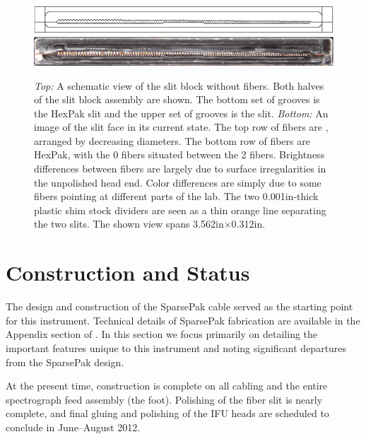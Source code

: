 \begin{figure}[t]
    \centering
    \includegraphics[width=\textwidth]{Pak_build/figs/slit}\\
    \vspace{2pt}
    \includegraphics[width=\textwidth]{Pak_build/figs/slit_img}
    \caption[HexPak/\GP slit]{\fixspacing \emph{Top:} A schematic view of the
      slit block without fibers.  Both halves of the slit block assembly are
      shown.  The bottom set of grooves is the HexPak slit and the upper set
      of grooves is the \GP slit.  \emph{Bottom:} An image of the slit
      face in its current state.  The top row of fibers are \GP, arranged
      by decreasing diameters.  The bottom row of fibers are HexPak, with the
      0 fibers situated between the 2 fibers.  Brightness
      differences between fibers are largely due to surface irregularities in
      the unpolished head end.  Color differences are simply due to some
      fibers pointing at different parts of the lab.  The two 0.001in-thick
      plastic shim stock dividers are seen as a thin orange line separating
      the two slits.  The shown view spans 3.562in$\times$0.312in.
    \label{fig:slit}}
\end{figure}


\section{Construction and Status} 
\label{GPB:sec:construction}

The design and construction of the SparsePak cable served as the starting
point for this instrument.  Technical details of SparsePak fabrication are
available in the Appendix section of \citet{Bershady04}.  In this
section we focus primarily on detailing the important features unique to this
instrument and noting significant departures from the SparsePak design.


At the present time, construction is complete on all cabling and the entire
spectrograph feed assembly (the foot).  Polishing of the fiber slit is nearly
complete, and final gluing and polishing of the IFU heads are scheduled to
conclude in June--August 2012.


